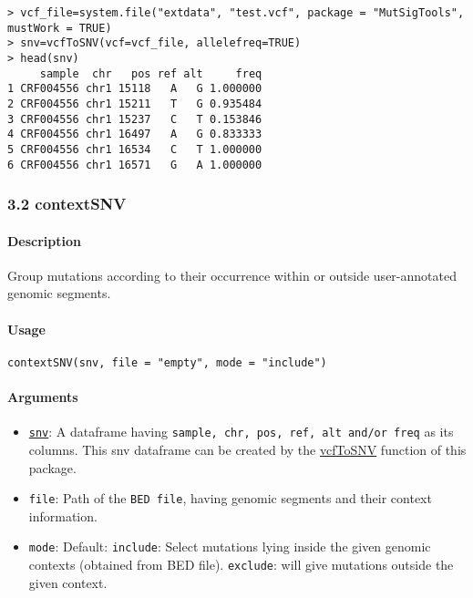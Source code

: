 \documentclass[]{article}
\providecommand{\tightlist}{%
  \setlength{\itemsep}{0pt}\setlength{\parskip}{0pt}}
\let\oldparagraph\paragraph
\renewcommand{\paragraph}[1]{\oldparagraph{#1}\mbox{}}
\begin{document}
\begin{verbatim}
> vcf_file=system.file("extdata", "test.vcf", package = "MutSigTools", mustWork = TRUE) 
> snv=vcfToSNV(vcf=vcf_file, allelefreq=TRUE)
> head(snv)
     sample  chr   pos ref alt     freq
1 CRF004556 chr1 15118   A   G 1.000000
2 CRF004556 chr1 15211   T   G 0.935484
3 CRF004556 chr1 15237   C   T 0.153846
4 CRF004556 chr1 16497   A   G 0.833333
5 CRF004556 chr1 16534   C   T 1.000000
6 CRF004556 chr1 16571   G   A 1.000000
\end{verbatim}

\subsubsection{3.2 contextSNV}\label{contextsnv}

\paragraph{\texorpdfstring{\textbf{Description}}{Description}}\label{description-1}

Group mutations according to their occurrence within or outside
user-annotated genomic segments.

\paragraph{\texorpdfstring{\textbf{Usage}}{Usage}}\label{usage-1}

\texttt{contextSNV(snv,\ file\ =\ "empty",\ mode\ =\ "include")}

\paragraph{\texorpdfstring{\textbf{Arguments
}}{Arguments }}\label{arguments-1}

\begin{itemize}
\tightlist
\item
  \protect\hyperlink{snv}{\texttt{snv}}: A dataframe having
  \texttt{sample,\ chr,\ pos,\ ref,\ alt\ and/or\ freq} as its columns.
  This snv dataframe can be created by the
  \protect\hyperlink{vcfToSNV}{vcfToSNV} function of this package.
\item
  \texttt{file}: Path of the \texttt{BED\ file}, having genomic segments
  and their context information.
\item
  \texttt{mode}: Default: \texttt{include}: Select mutations lying
  inside the given genomic contexts (obtained from BED file).
  \texttt{exclude}: will give mutations outside the given context.
\end{itemize}
\end{document}
